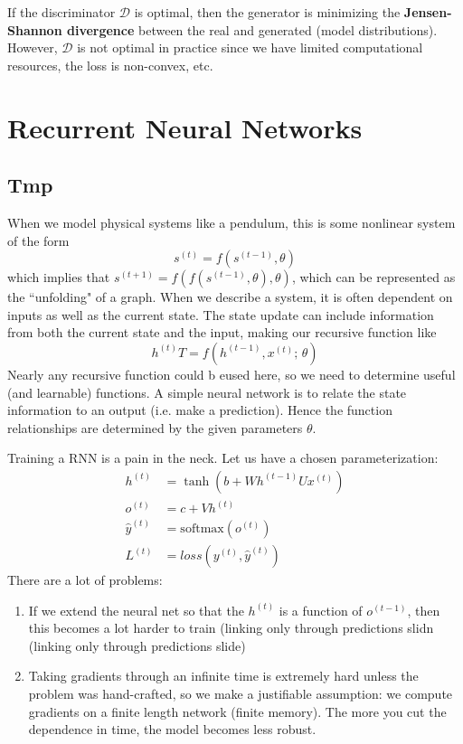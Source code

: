 \documentclass{article}
\theoremstyle{definition}
\theoremstyle{remark}
\theoremstyle{definition}
\begin{document}
  If the discriminator $\mathcal{D}$ is optimal, then the generator is minimizing the \textbf{Jensen-Shannon divergence} between the real and generated (model distributions). However, $\mathcal{D}$ is not optimal in practice since we have limited computational resources, the loss is non-convex, etc. 

\section{Recurrent Neural Networks}

\subsection{Tmp} 

When we model physical systems like a pendulum, this is some nonlinear system of the form
  \[s^{(t)} = f(s^{(t - 1)}, \theta)\]
which implies that $s^{(t+1)} = f(f(s^{(t-1)}, \theta), \theta)$, which can be represented as the ``unfolding" of a graph. When we describe a system, it is often dependent on inputs as well as the current state. The state update can include information from both the current state and the input, making our recursive function like 
  \[h^{(t)} T= f(h^{(t-1)}, x^{(t)}; \, \theta)\] 
Nearly any recursive function could b eused here, so we need to determine useful (and learnable) functions. A simple neural network is to relate the state information to an output (i.e. make a prediction). Hence the function relationships are determined by the given parameters $\theta$.

Training a RNN is a pain in the neck. Let us have a chosen parameterization: 
\begin{align*} 
    h^{(t)} & = \tanh(b + W h^{(t-1)} U x^{(t)}) \\
    o^{(t)} & = c + V h^{(t)} \\ 
    \hat{y}^{(t)} & = \mathrm{softmax}(o^{(t)}) \\
    L^{(t)} & = loss(y^{(t)}, \hat{y}^{(t)})
\end{align*} 
There are a lot of problems: 
\begin{enumerate}
    \item If we extend the neural net so that the $h^{(t)}$ is a function of $o^{(t-1)}$, then this becomes a lot harder to train (linking only through predictions slidn (linking only through predictions slide) 
    \item Taking gradients through an infinite time is extremely hard unless the problem was hand-crafted, so we make a justifiable assumption: we compute gradients on a finite length network (finite memory). The more you cut the dependence in time, the model becomes less robust.  
\end{enumerate}
\end{document}
